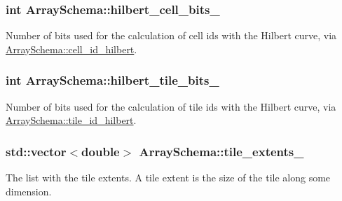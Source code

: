 \subsubsection[{hilbert\+\_\+cell\+\_\+bits\+\_\+}]{\setlength{\rightskip}{0pt plus 5cm}int Array\+Schema\+::hilbert\+\_\+cell\+\_\+bits\+\_\+\hspace{0.3cm}{\ttfamily [private]}}\label{classArraySchema_ad568c55fb480e4f11fd5fe44e5facbb1}
Number of bits used for the calculation of cell ids with the Hilbert curve, via \hyperlink{classArraySchema_ac6cdff730837d2857e02ea0d84e6797a}{Array\+Schema\+::cell\+\_\+id\+\_\+hilbert}. \hypertarget{classArraySchema_ab72cae879b11642bc812ca7e6f185bb7}{}
\subsubsection[{hilbert\+\_\+tile\+\_\+bits\+\_\+}]{\setlength{\rightskip}{0pt plus 5cm}int Array\+Schema\+::hilbert\+\_\+tile\+\_\+bits\+\_\+\hspace{0.3cm}{\ttfamily [private]}}\label{classArraySchema_ab72cae879b11642bc812ca7e6f185bb7}
Number of bits used for the calculation of tile ids with the Hilbert curve, via \hyperlink{classArraySchema_a5a35cd5e58d02ac3869a76f3a43350af}{Array\+Schema\+::tile\+\_\+id\+\_\+hilbert}. \hypertarget{classArraySchema_a45f6329cc884ce9446a3cd3006b526bc}{}
\subsubsection[{tile\+\_\+extents\+\_\+}]{\setlength{\rightskip}{0pt plus 5cm}std\+::vector$<$double$>$ Array\+Schema\+::tile\+\_\+extents\+\_\+\hspace{0.3cm}{\ttfamily [private]}}\label{classArraySchema_a45f6329cc884ce9446a3cd3006b526bc}
The list with the tile extents. A tile extent is the size of the tile along some dimension. \hypertarget{classArraySchema_a50e07e36d0fc5a08b61ddb18819492a0}{}
